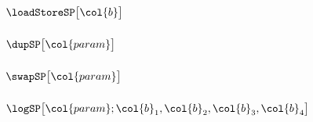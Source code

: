 \subsubsection{\zeroOneSP{}                                                                       \lispDone{}}  \label{hub: stack patterns: 0_1}              
\subsubsection{\oneOneSP{}                                                                        \lispDone{}}  \label{hub: stack patterns: 1_1}              
\subsubsection{\twoOneSP{}                                                                        \lispDone{}}  \label{hub: stack patterns: 2_1}              
\subsubsection{\threeOneSP{}                                                                      \lispDone{}}  \label{hub: stack patterns: 3_1}              
\subsubsection{$\loadStoreSP\big[\col{b}\big]$                                                    \lispDone{}}  \label{hub: stack patterns: load store}       
\subsubsection{$\dupSP\big[\col{param}\big]$                                                      \lispDone{}}  \label{hub: stack patterns: dup}              
\subsubsection{$\swapSP\big[\col{param}\big]$                                                     \lispDone{}}  \label{hub: stack patterns: swap}             
\subsubsection{$\logSP\big[\col{param}; \col{b}_{1}, \col{b}_{2}, \col{b}_{3}, \col{b}_{4} \big]$ \lispDone{}}  \label{hub: stack patterns: log}              
